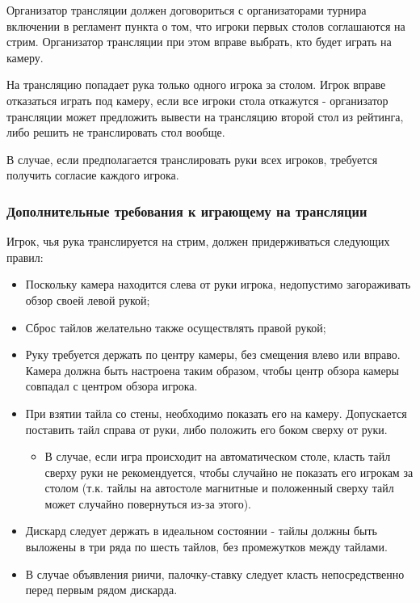 Организатор трансляции должен договориться с организаторами турнира включении в регламент пункта о том, что игроки первых столов соглашаются на стрим. Организатор трансляции при этом вправе выбрать, кто будет играть на камеру.

На трансляцию попадает рука только одного игрока за столом. Игрок вправе отказаться играть под камеру, если все игроки стола откажутся - организатор трансляции может предложить вывести на трансляцию второй стол из рейтинга, либо решить не транслировать стол вообще.

В случае, если предполагается транслировать руки всех игроков, требуется получить согласие каждого игрока.

\subsubsection{Дополнительные требования к играющему на трансляции}

Игрок, чья рука транслируется на стрим, должен придерживаться следующих правил:
\begin{itemize}
	\item Поскольку камера находится слева от руки игрока, недопустимо загораживать обзор своей левой рукой;
	\item Сброс тайлов желательно также осуществлять правой рукой;
	\item Руку требуется держать по центру камеры, без смещения влево или вправо. Камера должна быть настроена таким образом, чтобы центр обзора камеры совпадал с центром обзора игрока.
	\item При взятии тайла со стены, необходимо показать его на камеру. Допускается поставить тайл справа от руки, либо положить его боком сверху от руки. 
	\begin{itemize}
		\item В случае, если игра происходит на автоматическом столе, класть тайл сверху руки не рекомендуется, чтобы случайно не показать его игрокам за столом (т.к. тайлы на автостоле магнитные и положенный сверху тайл может случайно повернуться из-за этого).
	\end{itemize}
	\item Дискард следует держать в идеальном состоянии - тайлы должны быть выложены в три ряда по шесть тайлов, без промежутков между тайлами. 
	\item В случае объявления риичи, палочку-ставку следует класть непосредственно перед первым рядом дискарда.
\end{itemize}

